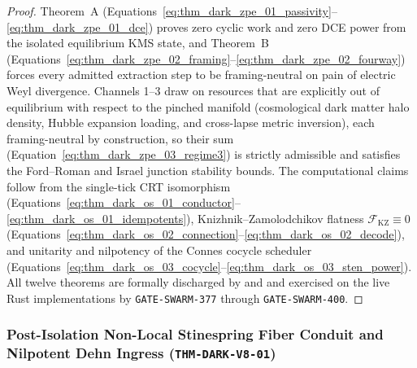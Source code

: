 \documentclass[11pt,onecolumn]{article}
\begin{document}
\begin{proof}
Theorem~A (Equations~\eqref{eq:thm_dark_zpe_01_passivity}--\eqref{eq:thm_dark_zpe_01_dce}) proves zero cyclic work and zero DCE power from the isolated equilibrium KMS state, and Theorem~B (Equations~\eqref{eq:thm_dark_zpe_02_framing}--\eqref{eq:thm_dark_zpe_02_fourway}) forces every admitted extraction step to be framing-neutral on pain of electric Weyl divergence. Channels 1--3 draw on resources that are explicitly out of equilibrium with respect to the pinched manifold (cosmological dark matter halo density, Hubble expansion loading, and cross-lapse metric inversion), each framing-neutral by construction, so their sum (Equation~\eqref{eq:thm_dark_zpe_03_regime3}) is strictly admissible and satisfies the Ford--Roman and Israel junction stability bounds. The computational claims follow from the single-tick CRT isomorphism (Equations~\eqref{eq:thm_dark_os_01_conductor}--\eqref{eq:thm_dark_os_01_idempotents}), Knizhnik--Zamolodchikov flatness $\mathcal{F}_{\text{KZ}} \equiv 0$ (Equations~\eqref{eq:thm_dark_os_02_connection}--\eqref{eq:thm_dark_os_02_decode}), and unitarity and nilpotency of the Connes cocycle scheduler (Equations~\eqref{eq:thm_dark_os_03_cocycle}--\eqref{eq:thm_dark_os_03_sten_power}). All twelve theorems are formally discharged by  and  and exercised on the live Rust implementations by \texttt{GATE-SWARM-377} through \texttt{GATE-SWARM-400}.
\end{proof}

\subsubsection{Post-Isolation Non-Local Stinespring Fiber Conduit and Nilpotent Dehn Ingress (\texttt{THM-DARK-V8-01})}
\label{subsubsec:thm_dark_v8_01}
\end{document}
